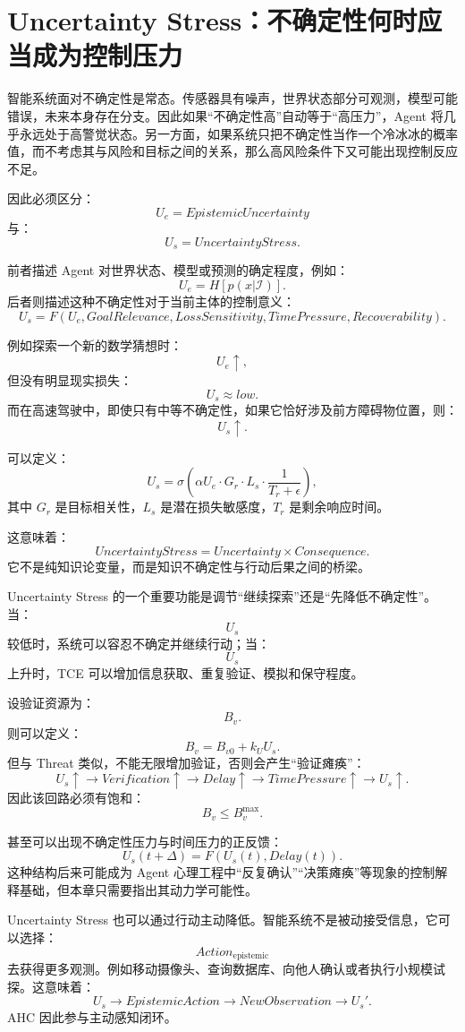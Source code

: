 \section{Uncertainty Stress：不确定性何时应当成为控制压力}

智能系统面对不确定性是常态。传感器具有噪声，世界状态部分可观测，模型可能错误，未来本身存在分支。因此如果“不确定性高”自动等于“高压力”，Agent 将几乎永远处于高警觉状态。另一方面，如果系统只把不确定性当作一个冷冰冰的概率值，而不考虑其与风险和目标之间的关系，那么高风险条件下又可能出现控制反应不足。

因此必须区分：
\[
U_e
=
EpistemicUncertainty
\]
与：
\[
U_s
=
UncertaintyStress.
\]

前者描述 Agent 对世界状态、模型或预测的确定程度，例如：
\[
U_e
=
H[p(x|\mathcal I)].
\]
后者则描述这种不确定性对于当前主体的控制意义：
\[
\boxed{
U_s
=
F(
U_e,
GoalRelevance,
LossSensitivity,
TimePressure,
Recoverability
).
}
\]

例如探索一个新的数学猜想时：
\[
U_e\uparrow,
\]
但没有明显现实损失：
\[
U_s\approx low.
\]
而在高速驾驶中，即使只有中等不确定性，如果它恰好涉及前方障碍物位置，则：
\[
U_s\uparrow.
\]

可以定义：
\[
U_s
=
\sigma
\left(
\alpha U_e
\cdot
G_r
\cdot
L_s
\cdot
\frac{1}{T_r+\epsilon}
\right),
\]
其中 \(G_r\) 是目标相关性，\(L_s\) 是潜在损失敏感度，\(T_r\) 是剩余响应时间。

这意味着：
\[
\boxed{
UncertaintyStress
=
Uncertainty\times Consequence.
}
\]
它不是纯知识论变量，而是知识不确定性与行动后果之间的桥梁。

Uncertainty Stress 的一个重要功能是调节“继续探索”还是“先降低不确定性”。当：
\[
U_s
\]
较低时，系统可以容忍不确定并继续行动；当：
\[
U_s
\]
上升时，TCE 可以增加信息获取、重复验证、模拟和保守程度。

设验证资源为：
\[
B_v.
\]
则可以定义：
\[
B_v
=
B_{v0}
+
k_U U_s.
\]
但与 Threat 类似，不能无限增加验证，否则会产生“验证瘫痪”：
\[
U_s\uparrow
\rightarrow
Verification\uparrow
\rightarrow
Delay\uparrow
\rightarrow
TimePressure\uparrow
\rightarrow
U_s\uparrow.
\]
因此该回路必须有饱和：
\[
B_v\leq B_v^{\max}.
\]

甚至可以出现不确定性压力与时间压力的正反馈：
\[
U_s(t+\Delta)
=
F(
U_s(t),
Delay(t)
).
\]
这种结构后来可能成为 Agent 心理工程中“反复确认”“决策瘫痪”等现象的控制解释基础，但本章只需要指出其动力学可能性。

Uncertainty Stress 也可以通过行动主动降低。智能系统不是被动接受信息，它可以选择：
\[
Action_{\mathrm{epistemic}}
\]
去获得更多观测。例如移动摄像头、查询数据库、向他人确认或者执行小规模试探。这意味着：
\[
U_s
\rightarrow
EpistemicAction
\rightarrow
NewObservation
\rightarrow
U_s'.
\]
AHC 因此参与主动感知闭环。

